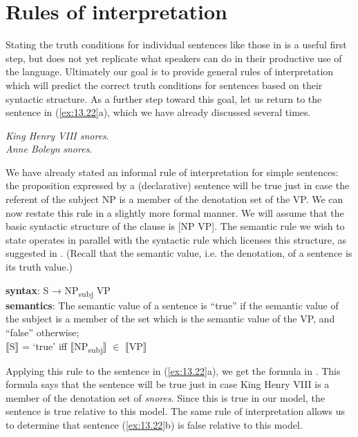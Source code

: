 \section{Rules of interpretation}\label{sec:13.5}

Stating the truth conditions for individual sentences like those in  is a useful first step, but does not yet replicate what speakers can do in their productive use of the language. Ultimately our goal is to provide general rules of interpretation which will predict the correct truth conditions for sentences based on their syntactic structure. As a further step toward this goal, let us return to the sentence in (\ref{ex:13.22}a), which we have already discussed several times.


\ea \label{ex:13.22}
\ea \textit{King Henry VIII snores}.\\
\ex \textit{Anne Boleyn} \textit{snores}.
                       \z
\z


We have already stated an informal rule of interpretation for simple sentences: the proposition expressed by a (declarative) sentence will be true just in case the referent of the subject NP is a member of the denotation set of the VP. We can now restate this rule in a slightly more formal manner. We will assume that the basic syntactic structure of the clause is [NP VP]. The semantic rule we wish to state operates in parallel with the syntactic rule which licenses this structure, as suggested in . (Recall that the semantic value, i.e. the denotation, of a sentence is its truth value.)


\ea \label{ex:13.23}
\textbf{syntax}: S  →  NP\textsubscript{subj}  VP\\
\textbf{semantics}: The semantic value of a sentence is “true” if the semantic value of the subject is a member of the set which is the semantic value of the VP, and “false” otherwise;\\
{}$\llbracket$S$\rrbracket$  = ‘true’  iff  $\llbracket$NP\textsubscript{subj}$\rrbracket$  ${\in}$ $\llbracket$VP$\rrbracket$ 
\z


Applying this rule to the sentence in (\ref{ex:13.22}a), we get the formula in . This formula says that the sentence will be true just in case King Henry VIII is a member of the denotation set of \textit{snores}. Since this is true in our model, the sentence is true relative to this model. The same rule of interpretation allows us to determine that sentence (\ref{ex:13.22}b) is false relative to this model.


